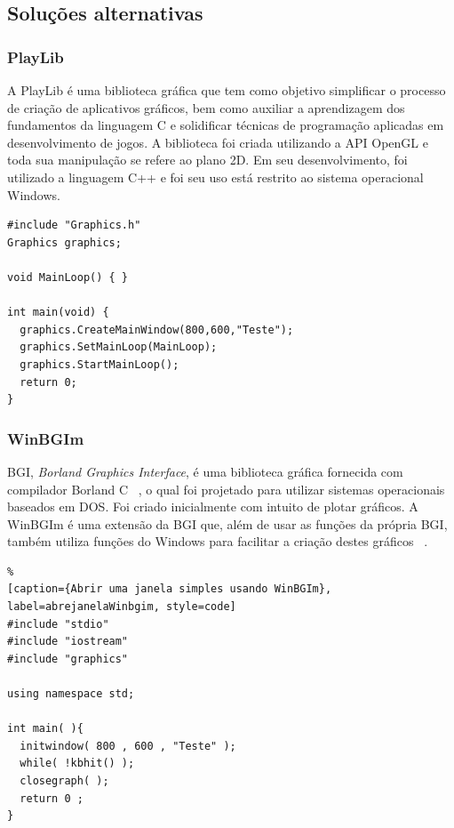 \subsection{Soluções alternativas}

\subsubsection{PlayLib}
A PlayLib é uma biblioteca gráfica que tem como objetivo simplificar o processo  de criação  de  aplicativos gráficos,  bem  como auxiliar  a aprendizagem dos fundamentos da  linguagem C e solidificar técnicas de programação aplicadas  em desenvolvimento de jogos.   A biblioteca foi criada utilizando  a \acrshort{API}  OpenGL e toda  sua manipulação se  refere ao plano 2D. Em seu desenvolvimento, foi utilizado a linguagem C++ e foi seu uso está restrito ao sistema operacional Windows.

\begin{lstlisting}[caption={Abrir uma janela simples usando PlayLib}, 
label=abrejanelaPlaylib,numbersep=.5mm, style=code]
#include "Graphics.h"
Graphics graphics;

void MainLoop() { }

int main(void) {
  graphics.CreateMainWindow(800,600,"Teste");
  graphics.SetMainLoop(MainLoop);
  graphics.StartMainLoop();
  return 0;
}
\end{lstlisting}

\subsubsection{WinBGIm}

BGI, \emph{Borland Graphics Interface}, é uma biblioteca gráfica fornecida com compilador Borland C ~\cite{borlandc}, o qual foi projetado para utilizar sistemas operacionais baseados em DOS. Foi criado inicialmente com intuito de plotar gráficos. A WinBGIm é uma extensão da BGI que, além de usar as funções da própria BGI, também utiliza funções do Windows para facilitar a criação destes gráficos ~\cite{winbgimGuia}. 

%

\begin{lstlisting}%
[caption={Abrir uma janela simples usando WinBGIm}, 
label=abrejanelaWinbgim, style=code]
#include "stdio"
#include "iostream"
#include "graphics"
 
using namespace std;
 
int main( ){
  initwindow( 800 , 600 , "Teste" );
  while( !kbhit() );
  closegraph( );
  return 0 ;
}
\end{lstlisting}

